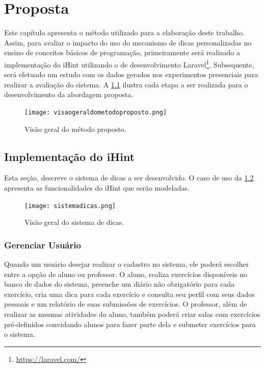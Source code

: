 \chapter{Proposta}

Este capítulo apresenta o método utilizado para a elaboração deste trabalho. Assim, para avaliar o impacto do uso do mecanismo de dicas personalizadas no ensino de conceitos básicos de programação, primeiramente será realizado a implementação do iHint utilizando o  de desenvolvimento Laravel\footnote{\url{https://laravel.com/}}. Subsequente, será efetuado um estudo com os dados gerados nos experimentos presenciais para realizar a avaliação do sistema. A \cref{figura:visaometodo} ilustra cada etapa a ser realizada para o desenvolvimento da abordagem proposta.

\begin{figure}[h]
	\captionsetup{justification=centering}
	\texttt{[image: visaogeraldometodoproposto.png]}
	\caption{Visão geral do método proposto.}
	\label{figura:visaometodo}
\end{figure}

\section{Implementação do iHint}

Esta seção, descreve o sistema de dicas a ser desenvolvido. O caso de uso da \cref{figura:sistemadicas} apresenta as funcionalidades do iHint que serão modeladas.

\begin{figure}[h]
	\centering
	\captionsetup{justification=centering}
	\texttt{[image: sistemadicas.png]}
	\caption{Visão geral do sistema de dicas.}
	\label{figura:sistemadicas}
\end{figure}

\subsection{Gerenciar Usuário}

Quando um usuário desejar realizar o cadastro no sistema, ele poderá escolher entre a opção de aluno ou professor. O aluno, realiza exercícios disponíveis no banco de dados do sistema, preenche um diário não obrigatório para cada exercício, cria uma dica para cada exercício e consulta seu perfil com seus dados pessoais e um relatório de suas submissões de exercícios. O professor, além de realizar as mesmas atividades do aluno, também poderá criar salas com exercícios pré-definidos convidando alunos para fazer parte dela e submeter exercícios para o sistema. 

